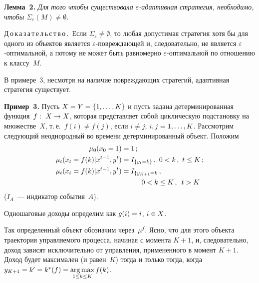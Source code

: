 \begin{multicols}{2}
  \medskip
  
  \noindent
  \textbf{Лемма~2.} \textit{Для того чтобы существовала $\varepsilon$-адап\-тив\-ная 
стратегия, необходимо, чтобы $\Sigma_\varepsilon(M)\not=\emptyset$.}
  \medskip
  
  \noindent
  Д\,о\,к\,а\,з\,а\,т\,е\,л\,ь\,с\,т\,в\,о\,.\ Если $\Sigma_\varepsilon\not= \emptyset$, то любая 
допустимая стратегия хотя бы для одного из объектов является 
  $\varepsilon$-по\-вреж\-да\-ющей и, следовательно, не является 
  $\varepsilon$-оп\-ти\-маль\-ной, а потому не может быть равномерно 
  $\varepsilon$-оп\-ти\-маль\-ной по отношению к классу~$M$.
  
  В примере~3, несмотря на наличие по\-вреж\-да\-ющих стратегий, адаптивная стратегия 
существует.
  
  \medskip
  
  \noindent
  \textbf{Пример~3.} Пусть $X\hm=Y\hm=\{1, \ldots , K\}$ и пусть задана 
детерминированная функция~$f:\ X\hm\rightarrow X$, которая представляет собой 
циклическую подстановку на множестве~$X$,  т.\,е.\ $f(i)\not= f(j)$, если $i\not= j$; 
$i,j\hm=1, \ldots , K$. Рассмотрим следующий неоднородный во времени 
детерминированный объект. Положим
  \begin{align*}
  \mu_0(x_0=1)&=1\,;\\
  \mu_t(x_t=f(k)\vert x^{t-1},y^t) &= I_{\{y_t=k\}}\,,\ 0<k\,,\ t\leq K\,;\\
  \mu_t(x_t=f(k)\vert x^{t-1},y^t) &=I_{\{y_{K+1}=k}\,,\\
  & \hspace*{10mm}0<k\leq K\,,\enskip t>K
  \end{align*}
($I_A$~--- индикатор события~$A$).
  
  Одношаговые доходы определим как $g(i)\hm=i$, $i\hm\in X$.
  
  Так определенный объект обозначим через~$\mu^f$. Ясно, что для этого объекта 
траектория управ\-ля\-емо\-го процесса, начиная с момента $K+1$, и, следовательно, доход 
зависят исключительно от управ\-ле\-ния, примененного в момент $K+1$. Доход будет 
максимален (и равен~$K$) тогда и только тогда, когда $y_{K+1}\hm= k^\prime \hm= 
k^*(f)\hm=\argmax\limits_{1\leq k\leq K} f(k)$.
  

\end{multicols}
